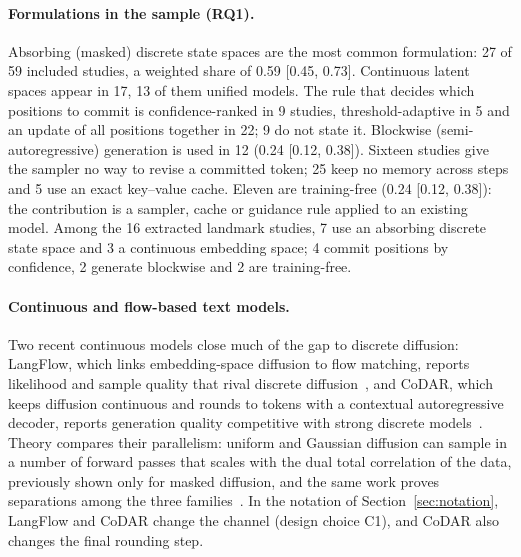 \paragraph{Formulations in the sample (RQ1).} Absorbing (masked) discrete state spaces are the most common formulation: 27 of 59 included studies, a weighted share of 0.59 [0.45, 0.73]. Continuous latent spaces appear in 17, 13 of them unified models. The rule that decides which positions to commit is confidence-ranked in 9 studies, threshold-adaptive in 5 and an update of all positions together in 22; 9 do not state it. Blockwise (semi-autoregressive) generation is used in 12 (0.24 [0.12, 0.38]). Sixteen studies give the sampler no way to revise a committed token; 25 keep no memory across steps and 5 use an exact key--value cache. Eleven are training-free (0.24 [0.12, 0.38]): the contribution is a sampler, cache or guidance rule applied to an existing model.%
Among the 16 extracted landmark studies, 7 use an absorbing discrete state space and 3 a continuous embedding space; 4 commit positions by confidence, 2 generate blockwise and 2 are training-free. %

\paragraph{Continuous and flow-based text models.} Two recent continuous models close much of the gap to discrete diffusion: LangFlow, which links embedding-space diffusion to flow matching, reports likelihood and sample quality that rival discrete diffusion~\cite{arXiv:2604.11748}, and CoDAR, which keeps diffusion continuous and rounds to tokens with a contextual autoregressive decoder, reports generation quality competitive with strong discrete models~\cite{arXiv:2603.02547}. Theory compares their parallelism: uniform and Gaussian diffusion can sample in a number of forward passes that scales with the dual total correlation of the data, previously shown only for masked diffusion, and the same work proves separations among the three families~\cite{arXiv:2609.20539}. In the notation of Section~\ref{sec:notation}, LangFlow and CoDAR change the channel (design choice C1), and CoDAR also changes the final rounding step.

